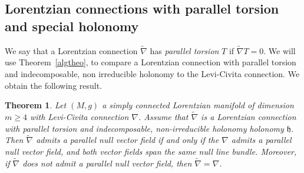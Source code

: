 \documentclass[11pt,a4paper]{amsart}
\newcommand{\tnab}{\widetilde{\nabla}}
\newcommand{\h}{\mathfrak{h}}
\newcommand{\+}{\oplus}
\newcommand{\1}{\mathbf{1}}
\newcommand{\<}{\langle}
\renewcommand{\>}{\rangle}
\theoremstyle{definition}
\theoremstyle{plain}
\newtheorem{lemma}[definition]{Lemma}
\newtheorem{theorem}[definition]{Theorem}
\numberwithin{equation}{section}
\begin{document}
\subsection{Lorentzian  connections with   parallel torsion and special holonomy}\label{LPTsec}
We say that a Lorentzian connection $\tnab$ has {\em parallel torsion} $T$ if $\tnab T=0$.
We will use  Theorem~\ref{algtheo}, to compare a Lorentzian connection with parallel torsion and indecomposable, non irreducible holonomy to the Levi-Civita connection. We obtain the following  result.

\begin{theorem}\label{vftheo}
Let $(M,g)$ a simply connected Lorentzian manifold of dimension $m\ge 4$ with Levi-Civita connection $\nabla$.  Assume that $\tnab$ is a Lorentzian connection with parallel torsion and  indecomposable, non-irreducible holonomy holonomy $\h$. Then $\tnab$ admits a parallel null vector field if and only if  the $\nabla$ admits a parallel null vector field, and both vector fields span the same null line bundle. Moreover, if $\tnab$ does not admit a parallel null vector field, then $\tnab=\nabla$.
\end{theorem}
%
%
\end{document}
